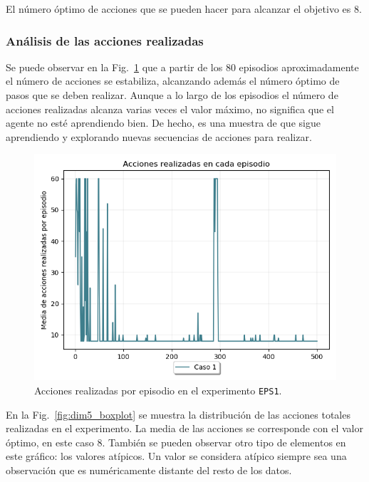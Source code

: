 El número óptimo de acciones que se pueden hacer para alcanzar el objetivo es 8. 

\subsubsection{Análisis de las acciones realizadas} 

Se puede observar en la Fig.~\ref{fig:dim5_acciones} que a partir de los 80 episodios aproximadamente el número de acciones se estabiliza, alcanzando además el número óptimo de pasos que se deben realizar. Aunque a lo largo de los episodios el número de acciones realizadas alcanza varias veces el valor máximo, no significa que el agente no esté aprendiendo bien. De hecho, es una muestra de que sigue aprendiendo y explorando nuevas secuencias de acciones para realizar.\\

\begin{figure}
    \centering
    \includegraphics[scale=0.4]{cap5_experimentacion/images/dim5_acciones.png}
    \caption{Acciones realizadas por episodio en el experimento \texttt{EPS1}.}
    \label{fig:dim5_acciones}
\end{figure}

En la Fig.~\ref{fig:dim5_boxplot} se muestra la distribución de las acciones totales realizadas en el experimento. La media de las acciones se corresponde con el valor óptimo, en este caso 8. También se pueden observar otro tipo de elementos en este gráfico: los valores atípicos. Un valor se considera atípico siempre sea una observación que es numéricamente distante del resto de los datos. \\
 
